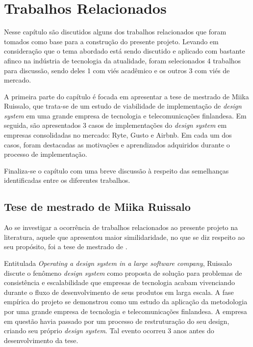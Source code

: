 
\chapter{Trabalhos Relacionados}
\label{chap:trabRelac}

Nesse capítulo são discutidos alguns dos trabalhos relacionados que foram tomados como base para a construção do presente projeto. Levando em consideração que o tema abordado está sendo discutido e aplicado com bastante afinco na indústria de tecnologia da atualidade, foram selecionados 4 trabalhos para discussão, sendo deles 1 com viés acadêmico e os outros 3 com viés de mercado. 

A primeira parte do capítulo é focada em apresentar a tese de mestrado de Miika Ruissalo, que trata-se de um estudo de viabilidade de implementação de \textit{design system} em uma grande empresa de tecnologia e telecomunicações finlandesa. Em seguida, são apresentados 3 casos de implementações do \textit{design system} em empresas consolidadas no mercado: Ryte, Gusto e Airbnb. Em cada um dos casos, foram destacadas as motivações e aprendizados adquiridos durante o processo de implementação.

Finaliza-se o capítulo com uma breve discussão à respeito das semelhanças identificadas entre os diferentes trabalhos.

\section{Tese de mestrado de Miika Ruissalo}
\label{sec:teseMestrado}

Ao se investigar a ocorrência de trabalhos relacionados ao presente projeto na literatura, aquele que apresentou maior similidaridade, no que se diz respeito ao seu propósito, foi a tese de mestrado de \cite{ruissalo2018operating}.

Entitulada \textit{Operating a design system in a large software company}, Ruissalo discute o fenômeno \textit{design system} como proposta de solução para problemas de consistência e escalabilidade que empresas de tecnologia acabam vivenciando durante o fluxo de desenvolvimento de seus produtos em larga escala. A fase empírica do projeto se demonstrou como um estudo da aplicação da metodologia por uma grande empresa de tecnologia e telecomunicações finlandesa. A empresa em questão havia passado por um processo de restruturação do seu design, criando seu próprio \textit{design system}. Tal evento ocorreu 3 anos antes do desenvolvimento da tese.


